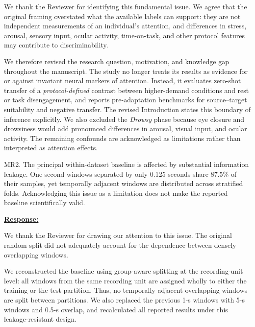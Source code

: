 \documentclass{article}
\begin{document}
We thank the Reviewer for identifying this fundamental issue. We agree that the
original framing overstated what the available labels can support: they are not
independent measurements of an individual's attention, and differences in
stress, arousal, sensory input, ocular activity, time-on-task, and other
protocol features may contribute to discriminability.

We therefore revised the research question, motivation, and knowledge gap
throughout the manuscript. The study no longer treats its results as evidence
for or against invariant neural markers of attention. Instead, it evaluates
zero-shot transfer of a \emph{protocol-defined} contrast between higher-demand
conditions and rest or task disengagement, and reports pre-adaptation benchmarks
for source--target suitability and negative transfer. The revised Introduction
states this boundary of inference explicitly. We also excluded the
\textit{Drowsy} phase because eye closure and drowsiness would add pronounced
differences in arousal, visual input, and ocular activity. The remaining
confounds are acknowledged as limitations rather than interpreted as attention
effects.

\vspace{0.3cm}


\begin{cmt}{}{}

MR2. The principal within-dataset baseline is affected by substantial
information leakage. One-second windows separated by only 0.125 seconds share
87.5\% of their samples, yet temporally adjacent windows are distributed across
stratified folds. Acknowledging this issue as a limitation does not make the
reported baseline scientifically valid.

\end{cmt}
\vspace{0.1cm}
\noindent
\underline{\textbf{Response:}}
\vspace{0.2cm}

We thank the Reviewer for drawing our attention to this issue. The original
random split did not adequately account for the dependence between densely
overlapping windows.

We reconstructed the baseline using group-aware splitting at the recording-unit
level: all windows from the same recording unit are assigned wholly to either
the training or the test partition. Thus, no temporally adjacent overlapping
windows are split between partitions. We also replaced the previous 1-s windows
with 5-s windows and 0.5-s overlap, and recalculated all reported results under
this leakage-resistant design.
\end{document}
